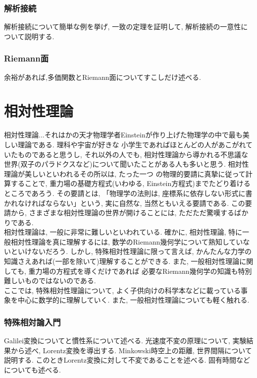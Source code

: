 \documentclass[a4j,dvipdfmx]{jsarticle}
\numberwithin{equation}{section}
\begin{document}
    \section{解析接続}
        解析接続について簡単な例を挙げ, 一致の定理を証明して, 解析接続の一意性について説明する.
    \clearpage
    \section{Riemann面}
        余裕があれば,多価関数とRiemann面についてすこしだけ述べる.
    \clearpage

    \part{相対性理論}
    \begin{screen}
        相対性理論...それはかの天才物理学者Einsteinが作り上げた物理学の中で最も美しい理論である. 理科や宇宙が好きな
        小学生であればほとんどの人があこがれていたものであると思うし, それ以外の人でも, 相対性理論から導かれる不思議な
        世界(双子のパラドクスなど)について聞いたことがある人も多いと思う. 相対性理論が美しいといわれるその所以は, たった一つ
        の物理的要請に真摯に従って計算することで, 重力場の基礎方程式(いわゆる, Einstein方程式)までたどり着けるところであろう. 
        その要請とは, 「物理学の法則は, 座標系に依存しない形式に書かれなければならない」という, 実に自然な, 当然ともいえる要請である.
        この要請から, さまざまな相対性理論の世界が開けることには, ただただ驚嘆するばかりである.\\
        相対性理論は, 一般に非常に難しいといわれている. 確かに, 相対性理論, 特に一般相対性理論を真に理解するには, 数学のRiemann幾何学について熟知していないといけないだろう.
        しかし, 特殊相対性理論に限って言えば, かんたんな力学の知識さえあれば(一部を除いて)理解することができる. また, 一般相対性理論に関しても, 重力場の方程式を導くだけであれば
        必要なRiemann幾何学の知識も特別難しいものではないのである.\\
        ここでは, 特殊相対性理論について, よく子供向けの科学本などに載っている事象を中心に数学的に理解していく.
        また, 一般相対性理論についても軽く触れる.
    \end{screen}
    \clearpage
    \section{特殊相対論入門}
        Galilei変換についてと慣性系について述べる. 光速度不変の原理について, 実験結果から述べ, Lorentz変換を導出する. 
         Minkowski時空上の距離, 世界間隔について説明する. このときLorentz変換に対して不変であることを述べる.
        固有時間などについても述べる.
    \clearpage
\end{document}
